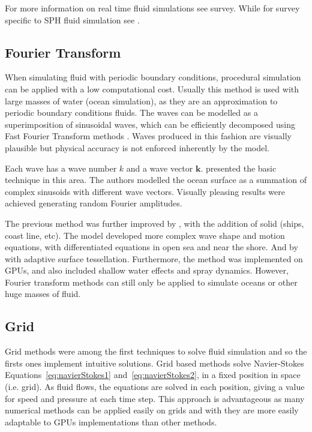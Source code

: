 For more information on real time fluid simulations see \cite{Vines2012} survey.
While for survey specific to SPH fluid simulation see \cite{Ihmsen2014}.

\subsection{Fourier Transform}

When simulating fluid with periodic boundary conditions, procedural simulation can be applied with a low computational cost.
Usually this method is used with large masses of water (ocean simulation), as they are an approximation to periodic boundary conditions fluids.
The waves can be modelled as a superimposition of sinusoidal waves, which can be efficiently decomposed using Fast Fourier Transform methods \cite{Mastin1987}.
Waves produced in this fashion are visually plausible but physical accuracy is not enforced inherently by the model.

Each wave has a wave number $k$ and a wave vector $\mathbf{k}$.
\cite{Tessendorf2001} presented the basic technique in this area.
The authors modelled the ocean surface as a summation of complex sinusoids with different wave vectors.
Visually pleasing results were achieved generating random Fourier amplitudes.

The previous method was further improved by \cite{Cieutat2003}, with the addition of solid (ships, coast line, etc).
The model developed more complex wave shape and motion equations, with differentiated equations in open sea and near the shore.
And by \cite{Chiu2006} with adaptive surface tessellation.
Furthermore, the method was implemented on GPUs, and also included shallow water effects and spray dynamics.
However, Fourier transform methods can still only be applied to simulate oceans or other huge masses of fluid. 

\subsection{Grid}
\label{gridFluidSolvers}

Grid methods were among the first techniques to solve fluid simulation and so the firsts ones implement intuitive solutions.
Grid based methods solve Navier-Stokes Equations~\ref{eq:navierStokes1} and~\ref{eq:navierStokes2}, in a fixed position in space (i.e. grid).
As fluid flows, the equations are solved in each position, giving a value for speed and pressure at each time step.
This approach is advantageous as many numerical methods can be applied easily on grids and with they are more easily adaptable to GPUs implementations than other methods.

